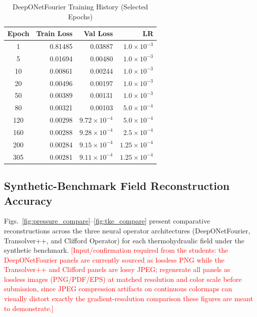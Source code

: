\documentclass[journal]{IEEEtran}
\begin{document}
\begin{table}[htbp]
\caption{DeepONetFourier Training History (Selected Epochs)}
\label{tab:loss_history}
\centering
\begin{tabular}{crrr}
\toprule
\textbf{Epoch} & \textbf{Train Loss} & \textbf{Val Loss} & \textbf{LR} \\
\midrule
1   & 0.81485 & 0.03887 & $1.0{\times}10^{-3}$ \\
5   & 0.01694 & 0.00480 & $1.0{\times}10^{-3}$ \\
10  & 0.00861 & 0.00244 & $1.0{\times}10^{-3}$ \\
20  & 0.00496 & 0.00197 & $1.0{\times}10^{-3}$ \\
50  & 0.00389 & 0.00131 & $1.0{\times}10^{-3}$ \\
80  & 0.00321 & 0.00103 & $5.0{\times}10^{-4}$ \\
120 & 0.00298 & $9.72{\times}10^{-4}$ & $5.0{\times}10^{-4}$ \\
160 & 0.00288 & $9.28{\times}10^{-4}$ & $2.5{\times}10^{-4}$ \\
200 & 0.00284 & $9.15{\times}10^{-4}$ & $1.25{\times}10^{-4}$ \\
305 & 0.00281 & $9.11{\times}10^{-4}$ & $1.25{\times}10^{-4}$ \\
\bottomrule
\end{tabular}
\end{table}

\subsection{Synthetic-Benchmark Field Reconstruction Accuracy}

Figs.~\ref{fig:pressure_compare}--\ref{fig:tke_compare} present comparative reconstructions across the three neural operator architectures (DeepONetFourier, Transolver++, and Clifford Operator) for each thermohydraulic field under the synthetic benchmark. \textcolor{red}{[Input/confirmation required from the students: the DeepONetFourier panels are currently sourced as lossless PNG while the Transolver++ and Clifford panels are lossy JPEG; regenerate all panels as lossless images (PNG/PDF/EPS) at matched resolution and color scale before submission, since JPEG compression artifacts on continuous colormaps can visually distort exactly the gradient-resolution comparison these figures are meant to demonstrate.]}
\end{document}
